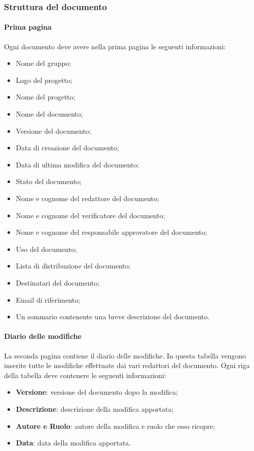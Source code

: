 \subsubsection{Struttura del documento}
\paragraph{Prima pagina}

Ogni documento deve avere nella prima pagina le seguenti informazioni:
\begin{itemize}
  \item Nome del gruppo;
  \item Logo del progetto;
  \item Nome del progetto;
  \item Nome del documento;
  \item Versione del documento;
  \item Data di creazione del documento;
  \item Data di ultima modifica del documento;
  \item Stato del documento;
  \item Nome e cognome del redattore del documento;
  \item Nome e cognome del verificatore del documento;
  \item Nome e cognome del responsabile approvatore del documento;
  \item Uso del documento;
  \item Lista di distribuzione del documento;
  \item Destinatari del documento;
  \item Email di riferimento;
  \item Un sommario contenente una breve descrizione del documento.
\end{itemize}
\paragraph{Diario delle modifiche}
La seconda pagina contiene il diario delle modifiche. In questa tabella vengono
inserite tutte le modifiche effettuate dai vari redattori del documento. Ogni
riga della tabella deve contenere le seguenti informazioni:
\begin{itemize}
  \item \textbf{Versione}: versione del documento dopo la modifica;
  \item \textbf{Descrizione}: descrizione della modifica apportata;
  \item \textbf{Autore e Ruolo}: autore della modifica e ruolo che esso ricopre;
  \item \textbf{Data}: data della modifica apportata.
\end{itemize}

